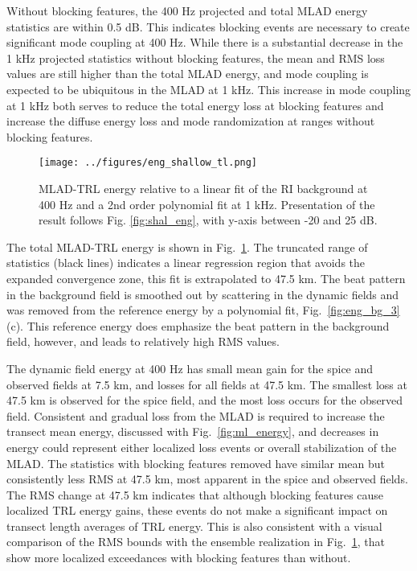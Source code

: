 \documentclass[preprint,NumberedRefs]{JASA}
\begin{document}
Without blocking features, the 400 Hz projected and total MLAD energy statistics are within 0.5 dB. This indicates blocking events are necessary to create significant mode coupling at 400 Hz. While there is a substantial decrease in the 1 kHz projected statistics without blocking features, the mean and RMS loss values are still higher than the total MLAD energy, and mode coupling is expected to be ubiquitous in the MLAD at 1 kHz. This increase in mode coupling at 1 kHz both serves to reduce the total energy loss at blocking features and increase the diffuse energy loss and mode randomization at ranges without blocking features.

\begin{figure}
\texttt{[image: ../figures/eng\_shallow\_tl.png]}
        \caption{MLAD-TRL energy relative to a linear fit of the RI background at 400 Hz and a 2nd order polynomial fit at 1 kHz. Presentation of the result follows Fig. \ref{fig:shal_eng}, with y-axis between -20 and 25 dB.}
    \label{fig:eng_tl}
\end{figure}
The total MLAD-TRL energy is shown in Fig.~\ref{fig:eng_tl}. The truncated range of statistics (black lines) indicates a linear regression region that avoids the expanded convergence zone, this fit is extrapolated to 47.5 km. The beat pattern in the background field is smoothed out by scattering in the dynamic fields and was removed from the reference energy by a polynomial fit, Fig.~\ref{fig:eng_bg_3}(c). This reference energy does emphasize the beat pattern in the background field, however, and leads to relatively high RMS values.

The dynamic field energy at 400 Hz has small mean gain for the spice and observed fields at 7.5 km, and losses for all fields at 47.5 km. The smallest loss at 47.5 km is observed for the spice field, and the most loss occurs for the observed field. Consistent and gradual loss from the MLAD is required to increase the transect mean energy, discussed with Fig.~\ref{fig:ml_energy}, and decreases in energy could represent either localized loss events or overall stabilization of the MLAD. The statistics with blocking features removed have similar mean but consistently less RMS at 47.5 km, most apparent in the spice and observed fields. The RMS change at 47.5 km indicates that although blocking features cause localized TRL energy gains, these events do not make a significant impact on transect length averages of TRL energy. This is also consistent with a visual comparison of the RMS bounds with the ensemble realization in Fig.~\ref{fig:eng_tl}, that show more localized exceedances with blocking features than without.
\end{document}
